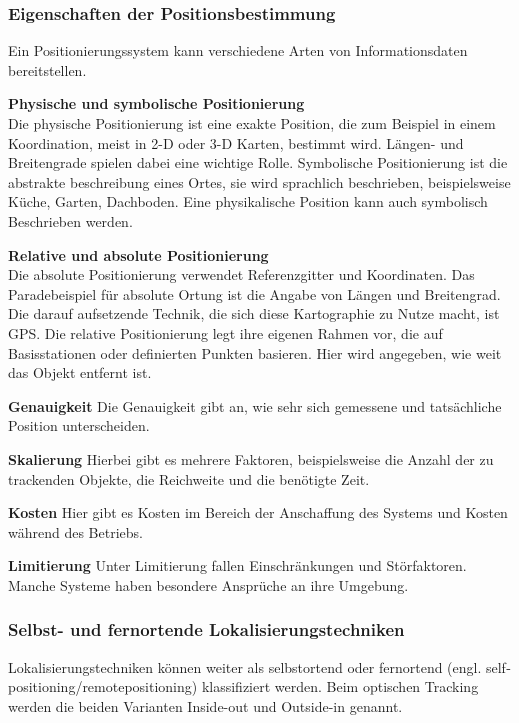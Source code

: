 \begin{itemize}
    \subsubsection{Eigenschaften der Positionsbestimmung}

    Ein Positionierungssystem kann verschiedene Arten von Informationsdaten bereitstellen. 

    \textbf{Physische und symbolische Positionierung}\\
    Die physische Positionierung ist eine exakte Position, die zum Beispiel in einem Koordination, meist in 2-D oder 3-D Karten, bestimmt wird. Längen- und Breitengrade spielen dabei eine wichtige Rolle.
    Symbolische Positionierung ist die abstrakte beschreibung eines Ortes, sie wird sprachlich beschrieben, beispielsweise Küche, Garten, Dachboden.
    Eine physikalische Position kann auch symbolisch Beschrieben werden.
    
    \textbf{Relative und absolute Positionierung}\\
    Die absolute Positionierung verwendet Referenzgitter und Koordinaten. Das Paradebeispiel für absolute Ortung ist die Angabe von Längen­ und Breitengrad.   Die darauf aufsetzende Technik, die sich diese Kartographie zu Nutze macht, ist GPS. 
    Die relative Positionierung legt ihre eigenen Rahmen vor, die auf Basisstationen oder definierten Punkten basieren. Hier wird angegeben, wie weit das Objekt entfernt ist.

    \textbf{Genauigkeit}
    Die Genauigkeit gibt an, wie sehr sich gemessene und tatsächliche Position unterscheiden.

    \textbf{Skalierung}
    Hierbei gibt es mehrere Faktoren, beispielsweise die Anzahl der zu trackenden Objekte, die Reichweite und die benötigte Zeit.

    \textbf{Kosten}
    Hier gibt es Kosten im Bereich der Anschaffung des Systems und Kosten während des Betriebs.

    \textbf{Limitierung}
    Unter Limitierung fallen Einschränkungen und Störfaktoren. Manche Systeme haben besondere Ansprüche an ihre Umgebung.

    \subsubsection{Selbst- und fernortende Lokalisierungstechniken}

    Lokalisierungstechniken können weiter als selbstortend oder fernortend (engl. self­positioning/remote­positioning) klassifiziert werden. Beim optischen Tracking werden die beiden Varianten Inside-out und Outside-in genannt.


\end{itemize}
